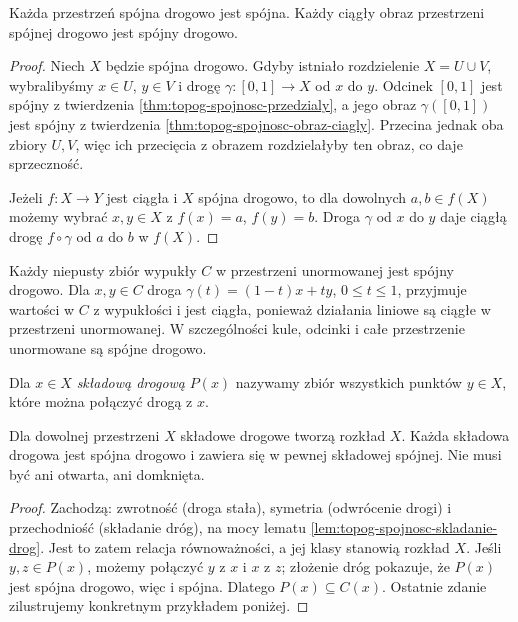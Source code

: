 \begin{twierdzenie}
\label{thm:topog-spojnosc-droga-implikuje}
Każda przestrzeń spójna drogowo jest spójna.
Każdy ciągły obraz przestrzeni spójnej
drogowo jest spójny drogowo.
\end{twierdzenie}
\begin{proof}
Niech $X$ będzie spójna drogowo.
Gdyby istniało rozdzielenie $X=U\cup V$,
wybralibyśmy $x\in U$, $y\in V$ i drogę
$\gamma:[0,1]\to X$ od $x$ do $y$.
Odcinek $[0,1]$ jest spójny z twierdzenia
\ref{thm:topog-spojnosc-przedzialy}, a jego
obraz $\gamma([0,1])$ jest spójny z twierdzenia
\ref{thm:topog-spojnosc-obraz-ciagly}.
Przecina jednak oba zbiory $U,V$,
więc ich przecięcia z obrazem rozdzielałyby
ten obraz, co daje sprzeczność.

Jeżeli $f:X\to Y$ jest ciągła i $X$
spójna drogowo, to dla dowolnych
$a,b\in f(X)$ możemy wybrać
$x,y\in X$ z $f(x)=a$, $f(y)=b$.
Droga $\gamma$ od $x$ do $y$ daje
ciągłą drogę $f\circ\gamma$ od $a$
do $b$ w $f(X)$.
\end{proof}

\begin{przyklad}
\label{ex:topog-spojnosc-wypukle}
Każdy niepusty zbiór wypukły $C$ w
przestrzeni unormowanej jest spójny drogowo.
Dla $x,y\in C$ droga
$\gamma(t)=(1-t)x+ty$, $0\le t\le1$,
przyjmuje wartości w $C$ z wypukłości
i jest ciągła, ponieważ działania liniowe
są ciągłe w przestrzeni unormowanej.
W szczególności kule, odcinki i całe
przestrzenie unormowane są spójne drogowo.
\end{przyklad}

\begin{definicja}
\label{def:topog-spojnosc-skladowa-drogowa}
Dla $x\in X$ \emph{składową drogową} $P(x)$
nazywamy zbiór wszystkich punktów $y\in X$,
które można połączyć drogą z $x$.
\end{definicja}

\begin{stwierdzenie}
\label{prop:topog-spojnosc-skladowe-drogowe}
Dla dowolnej przestrzeni $X$ składowe drogowe
tworzą rozkład $X$. Każda składowa drogowa
jest spójna drogowo i zawiera się w pewnej
składowej spójnej. Nie musi być ani otwarta,
ani domknięta.
\end{stwierdzenie}
\begin{proof}
Zachodzą: zwrotność (droga stała), symetria
(odwrócenie drogi) i przechodniość
(składanie dróg), na mocy lematu
\ref{lem:topog-spojnosc-skladanie-drog}.
Jest to zatem relacja równoważności,
a jej klasy stanowią rozkład $X$.
Jeśli $y,z\in P(x)$, możemy połączyć
$y$ z $x$ i $x$ z $z$; złożenie dróg
pokazuje, że $P(x)$ jest spójna drogowo,
więc i spójna. Dlatego $P(x)\subseteq C(x)$.
Ostatnie zdanie zilustrujemy konkretnym
przykładem poniżej.
\end{proof}

